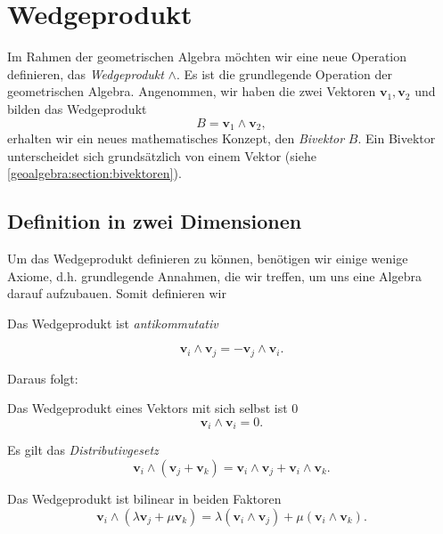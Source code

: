 
\section{Wedgeprodukt
\label{geoalgebra:section:wedgeprodukt}}

Im Rahmen der geometrischen Algebra möchten wir eine neue Operation
definieren, das \emph{Wedgeprodukt} $\wedge$.
Es ist die grundlegende Operation der geometrischen
Algebra.
Angenommen, wir haben die
zwei Vektoren $\mathbf{v}_1, \mathbf{v}_2$ und bilden das Wedgeprodukt
\begin{equation}
  B = \mathbf{v}_1 \wedge \mathbf{v}_2,
\end{equation}
erhalten wir ein neues mathematisches Konzept, den \emph{Bivektor} $B$.
Ein Bivektor unterscheidet sich grundsätzlich von einem Vektor (siehe \autoref{geoalgebra:section:bivektoren}).

\subsection{Definition in zwei Dimensionen}
Um das Wedgeprodukt definieren zu können, benötigen wir einige wenige Axiome, d.h. grundlegende Annahmen, die wir treffen,
um uns eine Algebra darauf aufzubauen. Somit definieren wir

\begin{axiom}
  Das Wedgeprodukt ist \em{antikommutativ}

  \begin{equation*}
  \mathbf{v}_i \wedge \mathbf{v}_j = -\mathbf{v}_j \wedge \mathbf{v}_i.
  \end{equation*}
  \label{geoalgebra:axiom:antikommutativ}
\end{axiom}
Daraus folgt:
\begin{lemma}
  Das Wedgeprodukt eines Vektors mit sich selbst ist $0$
  \begin{equation*}
  \mathbf{v}_i \wedge \mathbf{v}_i = 0.
  \end{equation*}
\end{lemma}

\begin{axiom}
  Es gilt das \em{Distributivgesetz}
  \begin{equation*}
  \mathbf{v}_i \wedge (\mathbf{v}_j + \mathbf{v}_k) = \mathbf{v}_i \wedge \mathbf{v}_j + \mathbf{v}_i \wedge \mathbf{v}_k.
  \end{equation*}
\end{axiom}

\begin{axiom}
  Das Wedgeprodukt ist bilinear in beiden Faktoren
  \begin{equation*}
  \mathbf{v}_i \wedge (\lambda \mathbf{v}_j + \mu \mathbf{v}_k) 
  = \lambda (\mathbf{v}_i \wedge \mathbf{v}_j) + \mu (\mathbf{v}_i \wedge \mathbf{v}_k).
  \end{equation*}
\end{axiom}

